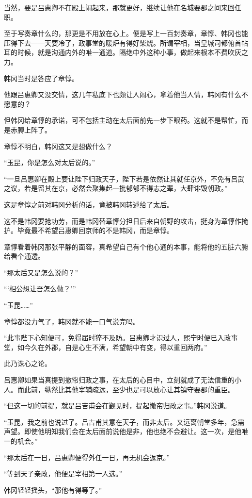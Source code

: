 当然，要是吕惠卿不在殿上闹起来，那就更好，继续让他在名城要郡之间来回任职。

至于写奏章什么的，那更是不用放在心上。便是写上一百封奏章，章惇、韩冈也能压得下去——天要冷了，政事堂的暖炉有得好柴烧。所谓宰相，当皇城司都俯首帖耳的时候，就是沟通内外的唯一通道。隔绝中外这种小事，做起来根本不费吹灰之力。

韩冈当时是答应了章惇。

他跟吕惠卿又没交情，这几年私底下也颇让人闹心，拿着他当人情，韩冈有什么不愿意的？

但韩冈给章惇的承诺，可不包括主动在太后面前先一步下眼药。这就不是帮忙，而是赤膊上阵了。

章惇不明白，韩冈这又是想做什么？

“玉昆，你是怎么对太后说的。”

“一旦吕惠卿在殿上要让陛下归政天子，陛下若是依然让其就任京外，不免有吕武之议，若是留其在京，必然会聚集起一批郁郁不得志之辈，大肆诽毁朝政。”

这是章惇之前对韩冈分析的话，竟被韩冈转述给了太后。

这不是韩冈要抢功劳，而是韩冈替章惇分担日后来自朝野的攻击，挺身为章惇作掩护。毕竟最不希望吕惠卿回京师的不是韩冈，而是章惇。

章惇看着韩冈那张平静的面容，真希望自己有个他心通的本事，能将他的五脏六腑给看个通透。

“那太后又是怎么说的？”

“‘相公想让吾怎么做？’”

“玉昆……”

章惇都没力气了，韩冈就不能一口气说完吗。

“此事陛下心知便可，免得届时猝不及防。吕惠卿才识过人，熙宁时便已入政事堂，如今久在外郡，自是心生不满，希望朝中有变，得以重回两府。”

此乃诛心之论。

吕惠卿如果当真提到撤帘归政之事，在太后的心目中，立刻就成了无法信重的小人。而此前，纵然比其他宰辅疏远，至少也是可以放心让其镇守要郡的重臣。

“但这一切的前提，就是吕吉甫会在觐见时，提起撤帘归政之事。”韩冈说道。

“玉昆，我之前也说过了。吕吉甫其意在天子，而非太后。又远离朝堂多年，急需声望。即使他明知我们会在太后面前说他是非，他也绝不会避让。这一次，是他唯一的机会。”

“那太后在一日，吕惠卿便得外任一日，再无机会返京。”

“等到天子亲政，他便是宰相第一人选。”

韩冈轻轻摇头，“那他有得等了。”

